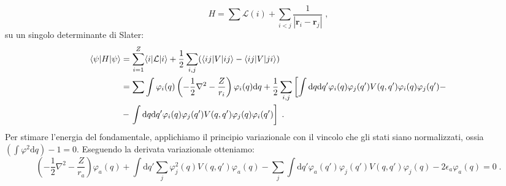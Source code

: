 \documentclass[12pt,a4paper]{report}
\theoremstyle{definition}
\newcommand{\lag}{\mathcal{L}}
\numberwithin{equation}{section}
\newcommand{\diff}[1][]{\mathrm{d}#1}
\newcommand{\bra}{\langle}
\newcommand{\ket}{\rangle}
\begin{document}
\begin{equation}
H=\sum \lag(i)+\sum_{i<j}\frac{1}{|\mathbf{r}_i-\mathbf{r}_j|}\;,
\end{equation}
su un singolo determinante di Slater:
\begin{align}
\bra\psi|H|\psi\ket &= \sum_{i=1}^Z\bra i|\lag|i\ket+\frac{1}{2}\sum_{i,j}(\bra ij|V|ij\ket-\bra ij|V|ji\ket) \notag \\
&= \sum \int\varphi_i(q)\left(-\frac{1}{2}\nabla^2-\frac{Z}{r_i}\right)\varphi_i(q)\diff{q}+\frac{1}{2}\sum_{i,j}\left[\int\diff{q}\diff{q'}\varphi_i(q)\varphi_j(q')V(q,q')\varphi_i(q)\varphi_j(q')-\right. \notag \\
&-\left.\int \diff{q}\diff{q'}\varphi_i(q)\varphi_j(q')V(q,q')\varphi_j(q)\varphi_i(q')\right]\;.
\end{align}
Per stimare l'energia del fondamentale, applichiamo il principio variazionale con il vincolo che gli stati siano normalizzati, ossia $\left(\int\varphi^2\diff{q}\right)-1=0$. Eseguendo la derivata variazionale otteniamo:
\begin{equation}
\left(-\frac{1}{2}\nabla^2-\frac{Z}{r_a}\right)\varphi_a(q)+\int\diff{q'}\sum_j \varphi_j^2(q)V(q,q')\varphi_a(q)-\sum_j\int\diff{q'}\varphi_a(q')\varphi_j(q')V(q,q')\varphi_j(q)-2\epsilon_a\varphi_a(q)=0\;.
\end{equation}
\end{document}
